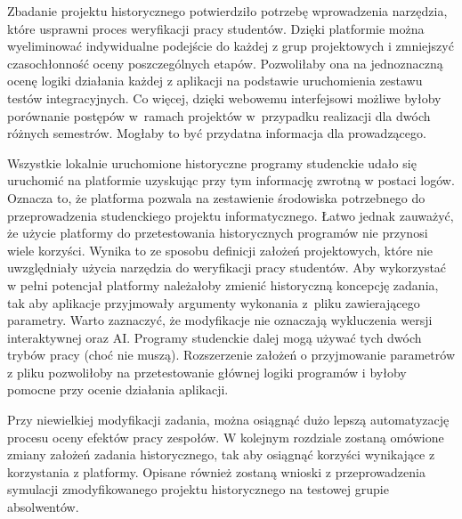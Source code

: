 Zbadanie projektu historycznego potwierdziło potrzebę wprowadzenia narzędzia, które usprawni proces weryfikacji pracy studentów.
Dzięki platformie można wyeliminować indywidualne podejście do każdej z grup projektowych i zmniejszyć czasochłonność oceny poszczególnych etapów.
Pozwoliłaby ona na jednoznaczną ocenę logiki działania każdej z aplikacji na podstawie uruchomienia zestawu testów integracyjnych.
Co więcej, dzięki webowemu interfejsowi możliwe byłoby porównanie postępów w~ramach projektów w~przypadku realizacji dla dwóch różnych semestrów.
Mogłaby to być przydatna informacja dla prowadzącego.

Wszystkie lokalnie uruchomione historyczne programy studenckie udało się uruchomić na platformie uzyskując przy tym informację zwrotną w postaci logów.
Oznacza to, że platforma pozwala na zestawienie środowiska potrzebnego do przeprowadzenia studenckiego projektu informatycznego.
Łatwo jednak zauważyć, że użycie platformy do przetestowania historycznych programów nie przynosi wiele korzyści.
Wynika to ze sposobu definicji założeń projektowych, które nie uwzględniały użycia narzędzia do weryfikacji pracy studentów.
Aby wykorzystać w pełni potencjał platformy należałoby zmienić historyczną koncepcję zadania, tak aby aplikacje przyjmowały argumenty wykonania z~pliku zawierającego parametry.
Warto zaznaczyć, że modyfikacje nie oznaczają wykluczenia wersji interaktywnej oraz AI.
Programy studenckie dalej mogą używać tych dwóch trybów pracy (choć nie muszą).
Rozszerzenie założeń o przyjmowanie parametrów z pliku pozwoliłoby na przetestowanie głównej logiki programów i byłoby pomocne przy ocenie działania aplikacji.

Przy niewielkiej modyfikacji zadania, można osiągnąć dużo lepszą automatyzację procesu oceny efektów pracy zespołów.
W kolejnym rozdziale zostaną omówione zmiany założeń zadania historycznego, tak aby osiągnąć korzyści wynikające z korzystania z platformy.
Opisane również zostaną wnioski z przeprowadzenia symulacji zmodyfikowanego projektu historycznego na testowej grupie absolwentów.




